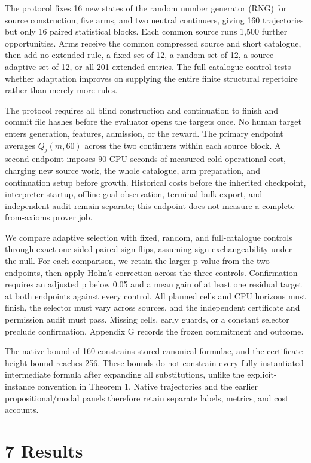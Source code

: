 \documentclass[pdflatex,sn-basic,Numbered]{sn-jnl}
\begin{document}
The protocol fixes 16 new states of the random number generator (RNG) for source construction, five arms, and two neutral continuers, giving 160 trajectories but only 16 paired statistical blocks. Each common source runs 1,500 further opportunities. Arms receive the common compressed source and short catalogue, then add no extended rule, a fixed set of 12, a random set of 12, a source-adaptive set of 12, or all 201 extended entries. The full-catalogue control tests whether adaptation improves on supplying the entire finite structural repertoire rather than merely more rules.

The protocol requires all blind construction and continuation to finish and commit file hashes before the evaluator opens the targets once. No human target enters generation, features, admission, or the reward. The primary endpoint averages \(Q_{j}(m,60)\) across the two continuers within each source block. A second endpoint imposes 90 CPU-seconds of measured cold operational cost, charging new source work, the whole catalogue, arm preparation, and continuation setup before growth. Historical costs before the inherited checkpoint, interpreter startup, offline goal observation, terminal bulk export, and independent audit remain separate; this endpoint does not measure a complete from-axioms prover job.

We compare adaptive selection with fixed, random, and full-catalogue controls through exact one-sided paired sign flips, assuming sign exchangeability under the null. For each comparison, we retain the larger p-value from the two endpoints, then apply Holm's correction across the three controls. Confirmation requires an adjusted p below 0.05 and a mean gain of at least one residual target at both endpoints against every control. All planned cells and CPU horizons must finish, the selector must vary across sources, and the independent certificate and permission audit must pass. Missing cells, early guards, or a constant selector preclude confirmation. Appendix G records the frozen commitment and outcome.

The native bound of 160 constrains stored canonical formulae, and the certificate-height bound reaches 256. These bounds do not constrain every fully instantiated intermediate formula after expanding all substitutions, unlike the explicit-instance convention in Theorem 1. Native trajectories and the earlier propositional/modal panels therefore retain separate labels, metrics, and cost accounts.

\section*{7 Results}\label{results}
\end{document}

